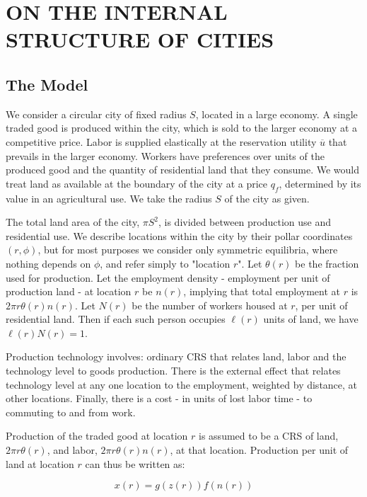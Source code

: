 \chapter{ON THE INTERNAL STRUCTURE OF CITIES}

\section{The Model}

We consider a circular city of fixed radius $S$, located in a large economy. A single traded good is produced within the city, which is sold to the larger economy at a competitive price. Labor is supplied elastically at the reservation utility $\overline{u}$ that prevails in the larger economy. Workers have preferences over units of the produced good and the quantity of residential land that they consume. We would treat land as available at the boundary of the city at a price $q_f$, determined by its value in an agricultural use. We take the radius $S$ of the city as given.

The total land area of the city, $\pi S^2$, is divided between production use and residential use. We describe locations within the city by their pollar coordinates $(r, \phi)$, but for most purposes we consider only symmetric equilibria, where nothing depends on $\phi$, and refer simply to "location $r$". Let $\theta(r)$ be the fraction used for production. Let the employment density - employment per unit of production land - at location $r$ be $n(r)$, implying that total employment at $r$ is $2\pi r \theta(r) n(r)$. Let $N(r)$ be the number of workers housed at $r$, per unit of residential land. Then if each such person occupies $\ell(r)$ units of land, we have $\ell(r) N(r) = 1$.

Production technology involves: ordinary CRS that relates land, labor and the technology level to goods production. There is the external effect that relates technology level at any one location to the employment, weighted by distance, at other locations. Finally, there is a cost - in units of lost labor time - to commuting to and from work.

Production of the traded good at location $r$ is assumed to be a CRS of land, $2 \pi r \theta(r)$, and labor, $2\pi r \theta(r) n(r)$, at that location. Production per unit of land at location $r$ can thus be written as:

\begin{equation}
    x(r) = g(z(r))f(n(r))
\end{equation}

